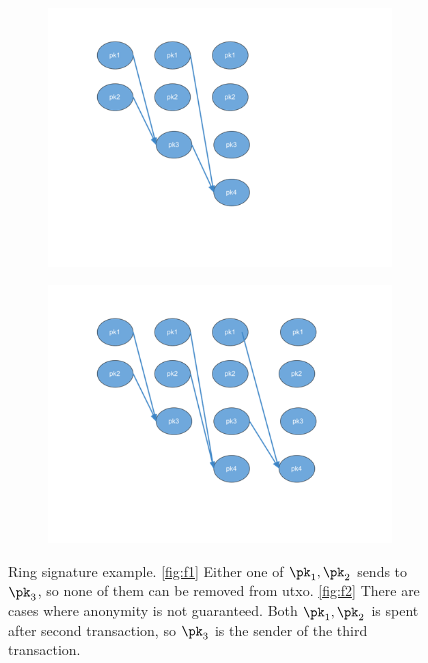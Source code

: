 \begin{figure}[!tbp]
    \begin{subfigure}[b]{0.5\textwidth}
        \includegraphics[width=\textwidth]{images/monero/ring_sing_ex.png}
        \caption{}
        \label{fig:f1}
    \end{subfigure}
    \begin{subfigure}[b]{0.5\textwidth}
        \includegraphics[width=\textwidth]{images/monero/ring_sing__bad_ex.png}
        \caption{}
        \label{fig:f2}
    \end{subfigure}
    \caption{Ring signature example. \autoref{fig:f1} Either one of $\pk_1, \pk_2$ sends to $\pk_3$, so none of them can be removed from utxo. \autoref{fig:f2} There are cases where anonymity is not guaranteed. Both $\pk_1, \pk_2$ is spent after second transaction, so $\pk_3$ is the sender of the third transaction.}
    \label{fig:ring-sig-ex}
\end{figure}

